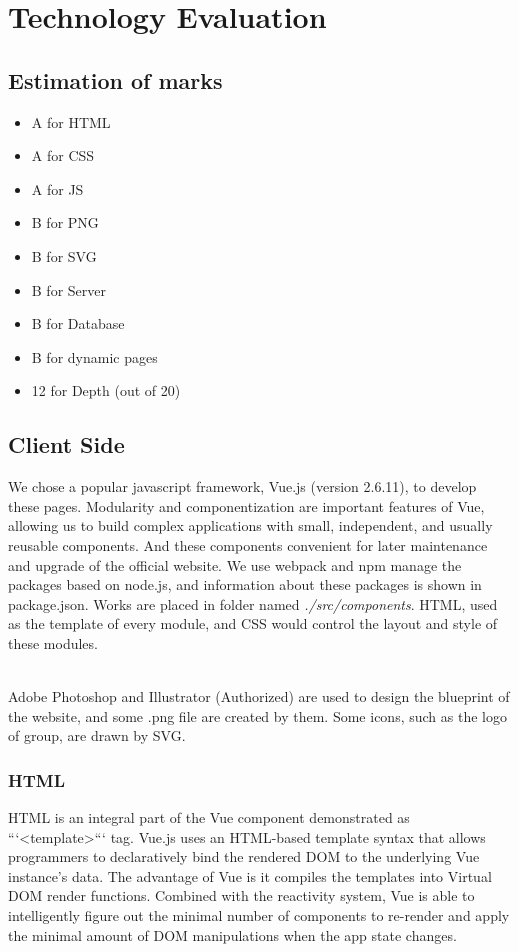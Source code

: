 \documentclass{article}
\begin{document}
\section{Technology Evaluation}
\subsection{Estimation of marks}
\begin{itemize}
    \item A for HTML
    \item A for CSS
    \item A for JS
    \item B for PNG
    \item B for SVG
    \item B for Server
    \item B for Database
    \item B for dynamic pages
    \item 12 for Depth (out of 20)
\end{itemize} 

\subsection{Client Side}
We chose a popular javascript framework, Vue.js (version 2.6.11), to 
develop these pages.
Modularity and componentization are important features of Vue,  
allowing us to build complex applications with small, independent, 
and usually reusable components. And these components convenient 
for later maintenance and upgrade of the official website. 
We use webpack and npm manage the packages based on node.js, and 
information about these packages is shown in package.json. Works are 
placed in folder named \textit{./src/components}. HTML, used as 
the template of every module, and CSS would control the layout 
and style of these modules.

~\\
\noindent
Adobe Photoshop and Illustrator (Authorized) are used to design the 
blueprint of the website, and some .png file are created by them. 
Some icons, such as the logo of group, are drawn by SVG.

\subsubsection{HTML}
HTML is an integral part of the Vue component demonstrated as ```<template>``` tag. 
Vue.js uses an HTML-based template syntax that allows programmers to declaratively 
bind the rendered DOM to the underlying Vue instance’s data. The advantage of Vue 
is it compiles the templates into Virtual DOM render functions. Combined with the 
reactivity system, Vue is able to intelligently figure out the minimal number of 
components to re-render and apply the minimal amount of DOM manipulations when the 
app state changes.
\end{document}
